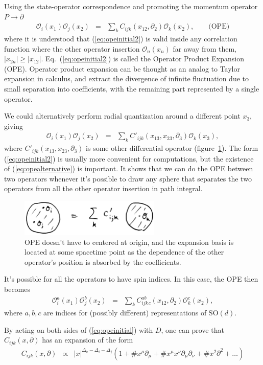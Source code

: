 \documentclass[12pt]{article}
\numberwithin{equation}{section}
\newcommand\be{\begin{eqnarray}}
\newcommand\ee{\end{eqnarray}}
\newcommand\cO{\mathcal{O}}
\newcommand\p[1]{\left(#1\right)}
\newcommand\ptl\partial
\newcommand\<\langle
\renewcommand\>\rangle
\newcommand\nn{\nonumber}
\renewcommand\.{\cdot}
\newcommand\SO{\mathrm{SO}}
\newcommand\De{\Delta}
\begin{document}
Using the state-operator correspondence and promoting the momentum operator $P\rightarrow\partial$
\be
\label{eq:opeinitial2}
\cO_i(x_1)\cO_j(x_2) &=& \sum_{k}C_{ijk}(x_{12},\ptl_2)\cO_k(x_2),\qquad\textrm{(OPE)}
\ee
where it is understood that (\ref{eq:opeinitial2}) is valid inside any correlation function where the other operator insertion $\cO_n(x_n)$ far away from them, $|x_{2n}|\geq |x_{12}|$.  Eq.~(\ref{eq:opeinitial2}) is called the Operator Product Expansion (OPE). Operator product expansion can be thought as an analog to Taylor expansion in calculus, and extract the divergence of infinite fluctuation due to small separation into coefficients, with the remaining part represented by a single operator.

We could alternatively perform radial quantization around a different point $x_3$, giving
\be
\label{eq:opealternative}
\cO_i(x_1)\cO_j(x_2) &=& \sum_k C'_{ijk}(x_{13},x_{23},\ptl_3)\cO_k(x_3),
\ee
where $C'_{ijk}(x_{13},x_{23},\ptl_3)$ is some other differential operator (figure~\ref{fig:radialquantotherpoint}).  The form  (\ref{eq:opeinitial2}) is usually more convenient for computations, but the existence of (\ref{eq:opealternative}) is important. It shows that we can do the OPE between two operators whenever it's possible to draw any sphere that separates the two operators from all the other operator insertion in path integral.

\begin{figure}[h]
\begin{center}
\includegraphics[width=0.6\textwidth]{radialquantotherpoint.jpg}
\end{center}
\caption{OPE doesn't have to centered at origin, and the expansion basis is located at some spacetime point as the  dependence 
 of the other operator's position is absorbed by the coefficients. \label{fig:radialquantotherpoint}}
\end{figure}

It's possible for all the operators to have spin indices.  In this case, the OPE then becomes
\be
\cO_i^a(x_1)\cO_j^b(x_2) &=& \sum_k C_{ijk}^{ab}{}_c(x_{12},\ptl_2)\cO_k^c(x_2),
\ee
where $a,b,c$ are indices for (possibly different) representations of $\SO(d)$.

By acting on both sides of (\ref{eq:opeinitial}) with $D$, one can prove that $C_{ijk}(x,\ptl)$ has an expansion of the form
\be
\label{eq:opeexpansionexample}
C_{ijk}(x,\ptl) &\propto& |x|^{\De_k-\De_i-\De_j}\p{1 +\# x^\mu\ptl_\mu + \# x^\mu x^\nu\ptl_\mu\ptl_\nu+\# x^2 \ptl^2 + \dots}\nn\\
\ee
\end{document}
